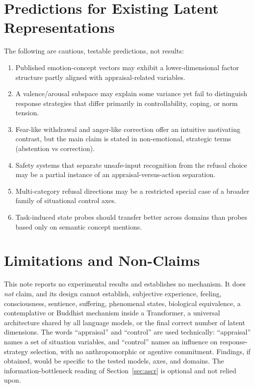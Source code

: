 \documentclass[11pt]{article}
\begin{document}
\section{Predictions for Existing Latent Representations}
\label{sec:predictions}

The following are cautious, testable predictions, not results:
\begin{enumerate}[leftmargin=1.5em]
\item Published emotion-concept vectors may exhibit a lower-dimensional factor
structure partly aligned with appraisal-related variables.
\item A valence/arousal subspace may explain some variance yet fail to distinguish
response strategies that differ primarily in controllability, coping, or norm
tension.
\item Fear-like withdrawal and anger-like correction offer an intuitive motivating
contrast, but the main claim is stated in non-emotional, strategic terms
(abstention vs correction).
\item Safety systems that separate unsafe-input recognition from the refusal choice
may be a partial instance of an appraisal-versus-action separation.
\item Multi-category refusal directions may be a restricted special case of a
broader family of situational control axes.
\item Task-induced state probes should transfer better across domains than probes
based only on semantic concept mentions.
\end{enumerate}

\section{Limitations and Non-Claims}
\label{sec:limitations}

This note reports no experimental results and establishes no mechanism. It does
\emph{not} claim, and its design cannot establish, subjective experience, feeling,
consciousness, sentience, suffering, phenomenal states, biological equivalence, a
contemplative or Buddhist mechanism inside a Transformer, a universal architecture
shared by all language models, or the final correct number of latent dimensions.
The words ``appraisal'' and ``control'' are used technically: ``appraisal'' names a
set of situation variables, and ``control'' names an influence on response-strategy
selection, with no anthropomorphic or agentive commitment. Findings, if obtained,
would be specific to the tested models, axes, and domains. The information-bottleneck
reading of Section~\ref{sec:ascr} is optional and not relied upon.
\end{document}
